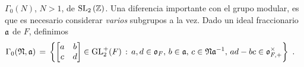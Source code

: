 $\Gamma_{0}(N)$, $N>1$, de $\SLZ$. Una diferencia importante con el grupo
modular, es que es necesario considerar \emph{varios} subgrupos a la vez.
Dado un ideal fraccionario $\frak{a}$ de $F$, definimos
\begin{align*}
	\Gamma_{0}(\frak{N},\frak{a}) &\,=\,
		\left\lbrace \left[\begin{matrix} a & b \\
			c & d \end{matrix}\right]\in\GLtp_{2}(F) \,:\,
			a,d\in\oka{F},\,b\in\frak{a},\,
			c\in\frak{N}\frak{a}^{-1},\,
			ad-bc\in\oka{F,+}^{\times}\right\rbrace
	\text{ .}
\end{align*}
%

